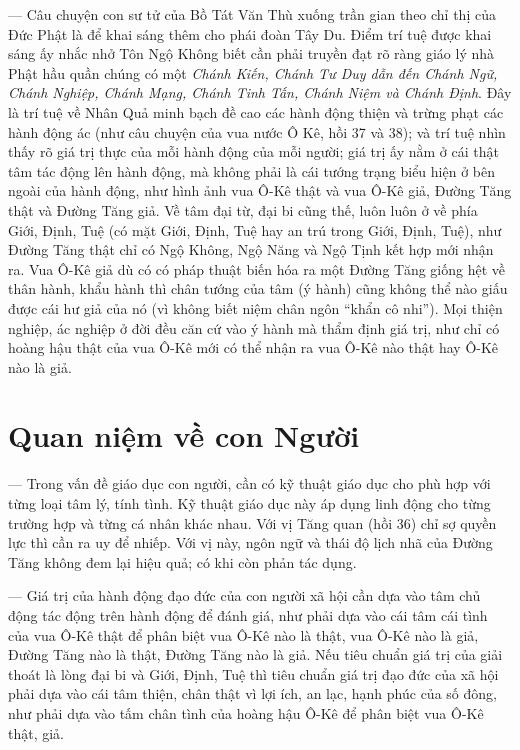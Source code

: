 — Câu chuyện con sư tử của Bồ Tát Văn Thù xuống trần gian theo chỉ thị của Đức Phật là để khai sáng thêm cho phái đoàn Tây Du. Điểm trí tuệ được khai sáng ấy nhắc nhở Tôn Ngộ Không biết cần phải truyền đạt rõ ràng giáo lý nhà Phật hầu quần chúng có một \emph{Chánh Kiến, Chánh Tư Duy dẫn đến Chánh Ngữ, Chánh Nghiệp, Chánh Mạng, Chánh Tinh Tấn, Chánh Niệm và Chánh Định}. Đây là trí tuệ về Nhân Quả minh bạch đề cao các hành động thiện và trừng phạt các hành động ác (như câu chuyện của vua nước Ô Kê, hồi 37 và 38); và trí tuệ nhìn thấy rõ giá trị thực của mỗi hành động của mỗi người; giá trị ấy nằm ở cái thật tâm tác động lên hành động, mà không phải là cái tướng trạng biểu hiện ở bên ngoài của hành động, như hình ảnh vua Ô-Kê thật và vua Ô-Kê giả, Đường Tăng thật và Đường Tăng giả. Về tâm đại từ, đại bi cũng thế, luôn luôn ở về phía Giới, Định, Tuệ (có mặt Giới, Định, Tuệ hay an trú trong Giới, Định, Tuệ), như Đường Tăng thật chỉ có Ngộ Không, Ngộ Năng và Ngộ Tịnh kết hợp mới nhận ra. Vua Ô-Kê giả dù có có pháp thuật biến hóa ra một Đường Tăng giống hệt về thân hành, khẩu hành thì chân tướng của tâm (ý hành) cũng không thể nào giấu được cái hư giả của nó (vì không biết niệm chân ngôn ``khẩn cô nhi''). Mọi thiện nghiệp, ác nghiệp ở đời đều căn cứ vào ý hành mà thẩm định giá trị, như chỉ có hoàng hậu thật của vua Ô-Kê mới có thể nhận ra vua Ô-Kê nào thật hay Ô-Kê nào là giả.

\section{Quan niệm về con Người} %
\label{sec:36_37_con_nguoi}

— Trong vấn đề giáo dục con người, cần có kỹ thuật giáo dục cho phù hợp với từng loại tâm lý, tính tình. Kỹ thuật giáo dục này áp dụng linh động cho từng trường hợp và từng cá nhân khác nhau. Với vị Tăng quan (hồi 36) chỉ sợ quyền lực thì cần ra uy để nhiếp. Với vị này, ngôn ngữ và thái độ lịch nhã của Đường Tăng không đem lại hiệu quả; có khi còn phản tác dụng.

— Giá trị của hành động đạo đức của con người xã hội cần dựa vào tâm chủ động tác động trên hành động để đánh giá, như phải dựa vào cái tâm cái tình của vua Ô-Kê thật để phân biệt vua Ô-Kê nào là thật, vua Ô-Kê nào là giả, Đường Tăng nào là thật, Đường Tăng nào là giả. Nếu tiêu chuẩn giá trị của giải thoát là lòng đại bi và Giới, Định, Tuệ thì tiêu chuẩn giá trị đạo đức của xã hội phải dựa vào cái tâm thiện, chân thật vì lợi ích, an lạc, hạnh phúc của số đông, như phải dựa vào tấm chân tình của hoàng hậu Ô-Kê để phân biệt vua Ô-Kê thật, giả.


